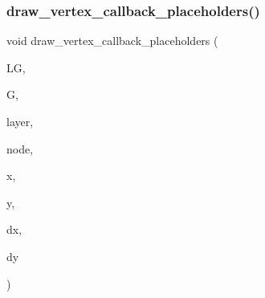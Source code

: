 \subsubsection{\texorpdfstring{draw\+\_\+vertex\+\_\+callback\+\_\+placeholders()}{draw\_vertex\_callback\_placeholders()}}
{\footnotesize\ttfamily void draw\+\_\+vertex\+\_\+callback\+\_\+placeholders (\begin{DoxyParamCaption}\item[{\mbox{\hyperlink{classlayered__graph}{layered\+\_\+graph}} $\ast$}]{LG,  }\item[{\mbox{\hyperlink{classmp__graphics}{mp\+\_\+graphics}} $\ast$}]{G,  }\item[{\mbox{\hyperlink{galois_8h_a09fddde158a3a20bd2dcadb609de11dc}{I\+NT}}}]{layer,  }\item[{\mbox{\hyperlink{galois_8h_a09fddde158a3a20bd2dcadb609de11dc}{I\+NT}}}]{node,  }\item[{\mbox{\hyperlink{galois_8h_a09fddde158a3a20bd2dcadb609de11dc}{I\+NT}}}]{x,  }\item[{\mbox{\hyperlink{galois_8h_a09fddde158a3a20bd2dcadb609de11dc}{I\+NT}}}]{y,  }\item[{\mbox{\hyperlink{galois_8h_a09fddde158a3a20bd2dcadb609de11dc}{I\+NT}}}]{dx,  }\item[{\mbox{\hyperlink{galois_8h_a09fddde158a3a20bd2dcadb609de11dc}{I\+NT}}}]{dy }\end{DoxyParamCaption})}

\mbox{\label{layered__graph__main_8_c_abc335287f04bbce709995f3a7c22d6b5}} 
